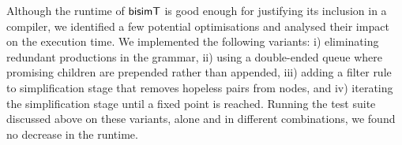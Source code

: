 Although the runtime of $\mathsf{bisimT}$ is good enough for justifying its
inclusion in a compiler, we identified a few potential optimisations
and analysed their impact on the execution time. We implemented the
following variants: i) eliminating redundant productions in the
grammar, ii) using a double-ended queue where promising children are
prepended rather than appended, iii) adding a filter rule to
simplification stage that removes hopeless pairs from nodes, and iv)
iterating the simplification stage until a fixed point is reached.
%
Running the test suite discussed above on these variants, alone and
in different combinations, we found no decrease in the runtime.




